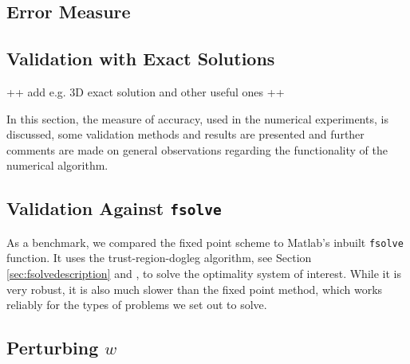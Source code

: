\documentclass[11pt, a4paper]{article}
\theoremstyle{definition}
\begin{document}
	\subsection{Error Measure}\label{sec:ErrorMeasure}
	

	\subsection{Validation with Exact Solutions}
	++ add e.g. 3D exact solution and other useful ones ++
	
	In this section, the measure of accuracy, used in the numerical experiments, is discussed, some validation methods and results are presented and further comments are made on general observations regarding the functionality of the numerical algorithm.


	
	\subsection{Validation Against \texttt{fsolve}}
	As a benchmark, we compared the fixed point scheme to Matlab's inbuilt \texttt{fsolve} function. It uses the trust-region-dogleg algorithm, see Section \ref{sec:fsolvedescription} and \cite{Powell1}, to solve the optimality system of interest. While it is very robust, it is also much slower than the fixed point method, which works reliably for the types of problems we set out to solve. 
	
	
	
	\subsection{Perturbing $w$}
	
	
\end{document}
